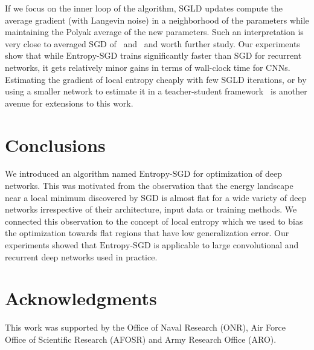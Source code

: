 \documentclass[10pt]{article}
\newcommand{\entropysgd}{\mathrm{Entropy}\textrm{-}\mathrm{SGD}}
\begin{document}
If we focus on the inner loop of the algorithm, SGLD updates compute the average gradient (with Langevin noise) in a neighborhood of the parameters while maintaining the Polyak average of the new parameters. Such an interpretation is very close to averaged SGD of~\citet{polyak1992acceleration} and~\citet{bottou2012stochastic} and worth further study. Our experiments show that while $\entropysgd$ trains significantly faster than SGD for recurrent networks, it gets relatively minor gains in terms of wall-clock time for CNNs. Estimating the gradient of local entropy cheaply with few SGLD iterations, or by using a smaller network to estimate it in a teacher-student framework~\citep{balan2015bayesian} is another avenue for extensions to this work.

\section{Conclusions}
\label{s:conclusions}

We introduced an algorithm named $\entropysgd$ for optimization of deep networks. This was motivated from the observation that the energy landscape near a local minimum discovered by SGD is almost flat for a wide variety of deep networks irrespective of their architecture, input data or training methods. We connected this observation to the concept of local entropy which we used to bias the optimization towards flat regions that have low generalization error. Our experiments showed that $\entropysgd$ is applicable to large convolutional and recurrent deep networks used in practice.

\section{Acknowledgments}
\label{s:acknowledgements}

This work was supported by the Office of Naval Research (ONR), Air Force Office of Scientific Research (AFOSR) and Army Research Office (ARO).

{
\footnotesize
\linespread{0.8}


}
\end{document}
